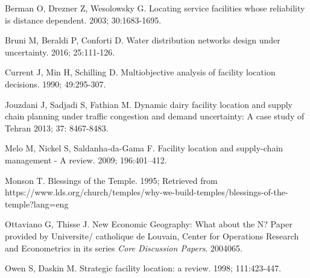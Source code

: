 \documentclass[twoside,twocolumn]{article}
\begin{document}
\begin{thebibliography}{99} %

Berman O, Drezner Z, Wesolowsky G.
\newblock Locating service facilities whose reliability is distance dependent.
 2003; 30:1683-1695.

Bruni M, Beraldi P, Conforti D.
\newblock Water distribution networks design under uncertainty.
 2016; 25:111-126.

Current J, Min H, Schilling D.
\newblock Multiobjective analysis of facility location decisions.
 1990; 49:295-307.


Jouzdani J, Sadjadi S, Fathian M.
\newblock Dynamic dairy facility location and supply chain planning under traffic congestion and demand uncertainty: A case study of Tehran
 2013; 37: 8467-8483.

Melo M, Nickel S, Saldanha-da-Gama F.
\newblock Facility location and supply-chain management - A review.
  2009; 196:401--412.

Monson T.
\newblock Blessings of the Temple. 1995;
\newblock Retrieved from https://www.lds.org/church/temples/why-we-build-temples/blessings-of-the-temple?lang=eng

Ottaviano G, Thisse J.
\newblock New Economic Geography: What about the N?
\newblock Paper provided by Universite/ catholique de Louvain, Center for Operations Research and Econometrics in its series {\em Core Discussion Papers}. 2004065.

Owen S, Daskin M.
\newblock Strategic facility location: a review.
 1998; 111:423-447.


\end{thebibliography}

\end{document}
